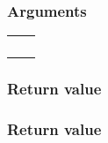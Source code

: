 \documentclass[letterpaper,10pt,english]{sphinxmanual}
\begin{document}
\subsubsection*{Arguments}


\begin{savenotes}\sphinxattablestart
\centering
\begin{tabulary}{\linewidth}[t]{|T|T|}
\hline

&\\
\hline
{}
&\\
\hline
{}
&\\
\hline
{}
&\\
\hline
{}
&\\
\hline
\end{tabulary}
\par
\sphinxattableend\end{savenotes}


\paragraph{}
\label{\detokenize{programming-interface/runtime/context:get}}
\begin{sphinxVerbatim}[commandchars=\\\{\}]
  
\end{sphinxVerbatim}
\subsubsection*{Return value}


\paragraph{}
\label{\detokenize{programming-interface/runtime/context:is-host}}
\begin{sphinxVerbatim}[commandchars=\\\{\}]
  
\end{sphinxVerbatim}
\subsubsection*{Return value}
\end{document}
